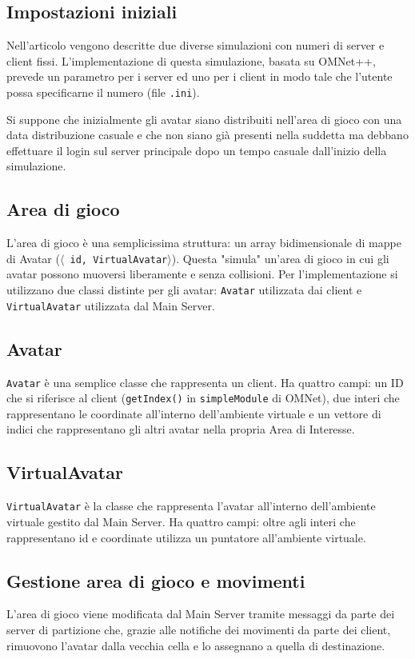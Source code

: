 \documentclass[a4paper, 11pt, oneside]{book}
\theoremstyle{definition}
\theoremstyle{remark}
\begin{document}
\subsection{Impostazioni iniziali}
Nell'articolo vengono descritte due diverse simulazioni con numeri di server
e client fissi. L'implementazione di questa simulazione, basata su OMNet++,
prevede un parametro per i server ed uno per i client in modo tale che l'utente
possa specificarne il numero (file \texttt{.ini}). 

Si suppone che inizialmente gli avatar siano distribuiti nell'area di gioco
con una data distribuzione casuale e che non siano già presenti nella suddetta
ma debbano effettuare il login sul server principale dopo un tempo casuale
dall'inizio della simulazione. 

\subsection{Area di gioco}
L'area di gioco è una semplicissima struttura: un array
bidimensionale di mappe di Avatar (\texttt{$\langle$ id, VirtualAvatar$\rangle$}).
Questa
"simula" un'area di gioco in cui gli avatar possono muoversi liberamente e
senza collisioni. Per l'implementazione si utilizzano due classi distinte
per gli avatar: \texttt{Avatar} utilizzata dai client e 
\texttt{VirtualAvatar} utilizzata dal Main Server.

\subsection{Avatar}
\texttt{Avatar} è una semplice classe che rappresenta un client. Ha quattro campi:
un ID che si riferisce al client (\texttt{getIndex()} in
\texttt{simpleModule} di OMNet),
due interi che rappresentano le coordinate all'interno dell'ambiente virtuale e
un vettore di indici che rappresentano gli altri avatar nella propria Area di 
Interesse.

\subsection{VirtualAvatar}
\texttt{VirtualAvatar} è la classe che rappresenta l'avatar all'interno
dell'ambiente
virtuale gestito dal Main Server. Ha quattro campi: oltre agli interi che
rappresentano id e coordinate utilizza un puntatore all'ambiente virtuale.

\subsection{Gestione area di gioco e movimenti}
L'area di gioco viene modificata dal Main Server tramite messaggi da parte
dei server di partizione che, grazie alle notifiche dei
movimenti da parte dei client, rimuovono l'avatar dalla vecchia cella
e lo assegnano a quella di destinazione.
 
\end{document}
